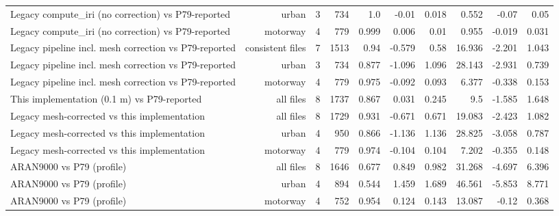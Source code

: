 \begin{table}[t]
{\begin{tabular}{lrrrrrrrrr}
Legacy compute\_iri (no correction) vs P79-reported & urban & 3 & 734 & 1.0 & -0.01 & 0.018 & 0.552 & -0.07 & 0.05 \\
Legacy compute\_iri (no correction) vs P79-reported & motorway & 4 & 779 & 0.999 & 0.006 & 0.01 & 0.955 & -0.019 & 0.031 \\
Legacy pipeline incl. mesh correction vs P79-reported & consistent files & 7 & 1513 & 0.94 & -0.579 & 0.58 & 16.936 & -2.201 & 1.043 \\
Legacy pipeline incl. mesh correction vs P79-reported & urban & 3 & 734 & 0.877 & -1.096 & 1.096 & 28.143 & -2.931 & 0.739 \\
Legacy pipeline incl. mesh correction vs P79-reported & motorway & 4 & 779 & 0.975 & -0.092 & 0.093 & 6.377 & -0.338 & 0.153 \\
This implementation (0.1 m) vs P79-reported & all files & 8 & 1737 & 0.867 & 0.031 & 0.245 & 9.5 & -1.585 & 1.648 \\
Legacy mesh-corrected vs this implementation & all files & 8 & 1729 & 0.931 & -0.671 & 0.671 & 19.083 & -2.423 & 1.082 \\
Legacy mesh-corrected vs this implementation & urban & 4 & 950 & 0.866 & -1.136 & 1.136 & 28.825 & -3.058 & 0.787 \\
Legacy mesh-corrected vs this implementation & motorway & 4 & 779 & 0.974 & -0.104 & 0.104 & 7.202 & -0.355 & 0.148 \\
ARAN9000 vs P79 (profile) & all files & 8 & 1646 & 0.677 & 0.849 & 0.982 & 31.268 & -4.697 & 6.396 \\
ARAN9000 vs P79 (profile) & urban & 4 & 894 & 0.544 & 1.459 & 1.689 & 46.561 & -5.853 & 8.771 \\
ARAN9000 vs P79 (profile) & motorway & 4 & 752 & 0.954 & 0.124 & 0.143 & 13.087 & -0.12 & 0.368 \\
\bottomrule
\end{tabular}}
\end{table}
